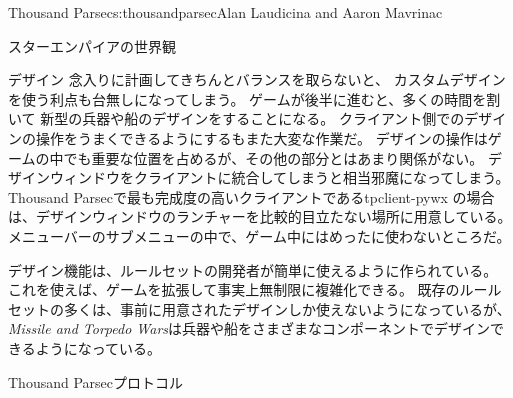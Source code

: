 \begin{aosachapter}{Thousand Parsec}{s:thousandparsec}{Alan Laudicina and Aaron Mavrinac}
\begin{aosasect1}{スターエンパイアの世界観}
\begin{aosasect2}{デザイン}
念入りに計画してきちんとバランスを取らないと、
カスタムデザインを使う利点も台無しになってしまう。
ゲームが後半に進むと、多くの時間を割いて
新型の兵器や船のデザインをすることになる。
クライアント側でのデザインの操作をうまくできるようにするもまた大変な作業だ。
デザインの操作はゲームの中でも重要な位置を占めるが、その他の部分とはあまり関係がない。
デザインウィンドウをクライアントに統合してしまうと相当邪魔になってしまう。
Thousand Parsecで最も完成度の高いクライアントであるtpclient-pywx
の場合は、デザインウィンドウのランチャーを比較的目立たない場所に用意している。
メニューバーのサブメニューの中で、ゲーム中にはめったに使わないところだ。

デザイン機能は、ルールセットの開発者が簡単に使えるように作られている。
これを使えば、ゲームを拡張して事実上無制限に複雑化できる。
既存のルールセットの多くは、事前に用意されたデザインしか使えないようになっているが、
\emph{Missile and Torpedo Wars}は兵器や船をさまざまなコンポーネントでデザインできるようになっている。

\end{aosasect2}

\end{aosasect1}

\begin{aosasect1}{Thousand Parsecプロトコル}


\end{aosasect1}
\end{aosachapter}
